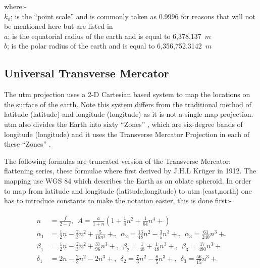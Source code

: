  where:-\\
  $k_o$; is the \enquote{point scale}  and is commonly taken as  0.9996 for reasons that will not be mentioned here but are listed in \cite{utm}\\
  $a$; is the equatorial radius of the earth and is equal to 6,378,137~$m$\\
  $b$; is the polar radius of the earth and is equal to 6,356,752.3142~$m$
  
   \tocless\subsection{Universal Transverse Mercator}
 The \gls{utm} projection uses a 2-D Cartesian based system to map the locations on the surface of the earth. Note this system differs from the traditional method of latitude (\gls{latitude}) and longitude (\gls{longitude}) as it is not a single map projection.  \gls{utm} also divides the Earth into sixty \enquote{Zones} , which are six-degree bands of longitude (\gls{longitude}) and it uses the Transverse Mercator Projection in each of these \enquote{Zones} \cite{utm}.
 
 The following formulas are truncated version of the Transverse Mercator: flattening series, these formulae where first derived by J.H.L Kr\"{u}ger in 1912. The mapping use WGS 84 which describes the Earth as an oblate spheroid. In order to map from latitude and longitude (\gls{latitude},\gls{longitude}) to \gls{utm} (\gls{east},\gls{north}) one has to introduce constants to make the notation easier, this is done first:-
 
 \begin{align}
 \begin{split}
 n                 &= \frac{f}{2-f},~~                                                                                           A=\frac{a}{1+n}\left(1 + \frac{1}{4}n^2 + \frac{1}{64}n^4 + \dddot{}\right)\\
 \alpha_1 &= \frac{1}{2}n - \frac{2}{3}n^2 + \frac{5}{16n^3} + \dddot{},       ~~\alpha_2 = \frac{13}{48}n^2 - \frac{3}{5}n^3 + \dddot{},     ~~\alpha_3   = \frac{61}{240}n^3 + \dddot{}\\
 \beta_1    &= \frac{1}{2}n - \frac{2}{3}n^2+\frac{37}{96}n^3 + \dddot{},      ~~\beta_2   = \frac{1}{48}+\frac{1}{48}n^3 + \dddot{},              ~~  \beta_3   = \frac{17}{480}n^3 + \dddot{}\\
 \delta_1  &=  2n-\frac{2}{3}n^2 - 2n^3 + \dddot{},                                                      ~~ \delta_2 = \frac{7}{3}n^2 - \frac{8}{5}n^3 + \dddot{},          ~~   \delta_3 =   \frac{56}{15}n^3  + \dddot{} 
 \end{split}
 \end{align}
 
